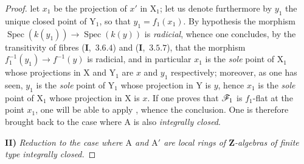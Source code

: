\begin{proof}
let $x_1$ be the projection of $x'$ in $\mathrm{X}_1$; let us denote furthermore by $y_1$ the unique closed point
of $\mathrm{Y}_1$, so that $y_1=f_1(x_1)$. By hypothesis the morphism $\operatorname{Spec}(k(y_1))\to\operatorname{Spec}(k(y))$
is \emph{radicial}, whence one concludes, by the transitivity of fibres (\textbf{I},~$3.6.4$) and (\textbf{I},~$3.5.7$), that
the morphism $f_1^{-1}(y_1)\to f^{-1}(y)$ is radicial, and in particular $x_1$ is the \emph{sole} point of $\mathrm{X}_1$
whose projections in $\mathrm{X}$ and $\mathrm{Y}_1$ are $x$ and $y_1$ respectively; moreover, as one has seen, $y_1$
is the \emph{sole} point of $\mathrm{Y}_1$ whose projection in $\mathrm{Y}$ is $y$, hence $x_1$ is the \emph{sole} point of $\mathrm{X}_1$
whose projection in $\mathrm{X}$ is $x$. If one proves that $\mathscr{F}_1$ is $f_1$-flat at the point $x_1$, one will be able to
apply , whence the conclusion. One is therefore brought back to the case where $\mathrm{A}$
is also \emph{integrally closed}.

\medskip
\noindent\textbf{II)} \emph{Reduction to the case where $\mathrm{A}$ and $\mathrm{A}'$ are local rings of $\mathbf{Z}$-algebras of finite type integrally
closed.}


\end{proof}
